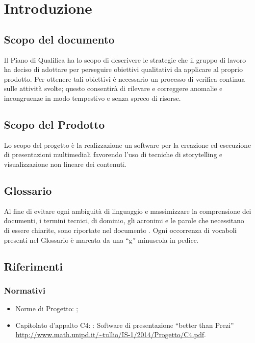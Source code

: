 \section{Introduzione}
\subsection{Scopo del documento}
Il Piano di Qualifica ha lo scopo di descrivere le strategie che il gruppo di lavoro ha deciso di adottare per perseguire obiettivi qualitativi da applicare al proprio prodotto. Per ottenere tali obiettivi è necessario un processo di verifica continua sulle attività svolte; questo consentirà di rilevare e correggere anomalie e incongruenze in modo tempestivo e senza spreco di risorse.
\subsection{Scopo del Prodotto}
Lo scopo del progetto è la realizzazione un software per la creazione ed esecuzione di presentazioni multimediali favorendo l’uso di tecniche di storytelling e visualizzazione non lineare dei contenuti.
\subsection{Glossario}
Al fine di evitare ogni ambiguità di linguaggio e massimizzare la comprensione dei documenti, i termini tecnici, di dominio, gli acronimi e le parole che necessitano di essere chiarite, sono riportate nel documento \href{run:../../Esterni/\fGlossario}{\fEscapeGlossario}. Ogni occorrenza di vocaboli presenti nel Glossario è marcata da una “g” minuscola in pedice.
\subsection{Riferimenti}

\subsubsection{Normativi}
\begin{itemize}
\item Norme di Progetto: \href{run:../../Interni/\fNormeDiProgetto}{\fEscapeNormeDiProgetto};
\item Capitolato d’appalto C4: \premi: Software di presentazione “better than Prezi” \\
\url{http://www.math.unipd.it/~tullio/IS-1/2014/Progetto/C4.pdf}.
\end{itemize}
